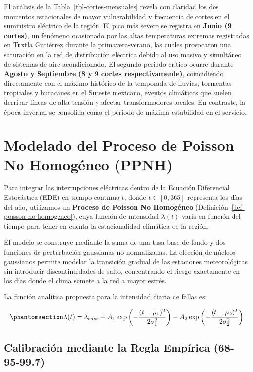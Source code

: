 \documentclass[
  spanish,
  us-letterpaper,
]{scrreprt}
\numberwithin{equation}{section}
\theoremstyle{plain}
\theoremstyle{plain}
\theoremstyle{plain}
\theoremstyle{definition}
\theoremstyle{remark}
\begin{document}
El análisis de la Tabla~\ref{tbl-cortes-mensuales} revela con claridad
los dos momentos estacionales de mayor vulnerabilidad y frecuencia de
cortes en el suministro eléctrico de la región. El pico más severo se
registra en \textbf{Junio (9 cortes)}, un fenómeno ocasionado por las
altas temperaturas extremas registradas en Tuxtla Gutiérrez durante la
primavera-verano, las cuales provocaron una saturación en la red de
distribución eléctrica debido al uso masivo y simultáneo de sistemas de
aire acondicionado. El segundo periodo crítico ocurre durante
\textbf{Agosto y Septiembre (8 y 9 cortes respectivamente)},
coincidiendo directamente con el máximo histórico de la temporada de
lluvias, tormentas tropicales y huracanes en el Sureste mexicano,
eventos climáticos que suelen derribar líneas de alta tensión y afectar
transformadores locales. En contraste, la época invernal se consolida
como el periodo de máxima estabilidad en el servicio.

\section{Modelado del Proceso de Poisson No Homogéneo
(PPNH)}\label{sec-ppnh}

Para integrar las interrupciones eléctricas dentro de la Ecuación
Diferencial Estocástica (EDE) en tiempo continuo \(t\), donde
\(t \in [0, 365]\) representa los días del año, utilizamos un
\textbf{Proceso de Poisson No Homogéneo}
(Definición~\ref{def-poisson-no-homogeneo}), cuya función de intensidad
\(\lambda(t)\) varía en función del tiempo para tener en cuenta la
estacionalidad climática de la región.

El modelo se construye mediante la suma de una tasa base de fondo y dos
funciones de perturbación gaussianas no normalizadas. La elección de
núcleos gaussianos permite modelar la transición gradual de las
estaciones meteorológicas sin introducir discontinuidades de salto,
concentrando el riesgo exactamente en los días donde el clima somete a
la red a mayor estrés.

La función analítica propuesta para la intensidad diaria de fallas es:

\begin{equation}\phantomsection\label{eq-lambda-teorica}{
\lambda(t) = \lambda_{base} + A_1 \exp\left(-\frac{(t - \mu_1)^2}{2\sigma_1^2}\right) + A_2 \exp\left(-\frac{(t - \mu_2)^2}{2\sigma_2^2}\right)
}\end{equation}

\subsection{Calibración mediante la Regla Empírica
(68-95-99.7)}\label{calibraciuxf3n-mediante-la-regla-empuxedrica-68-95-99.7}
\end{document}
